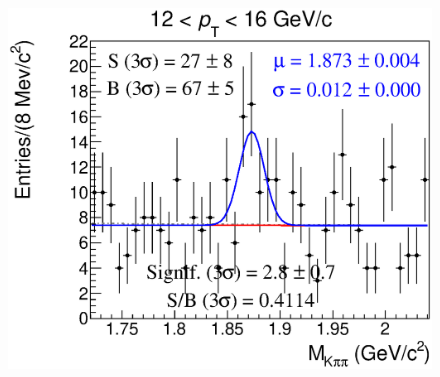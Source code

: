 \documentclass[b5paper,10pt,twoside,oldstyle,classica]{toptesi}
\begin{document}
\begin{figure}[h]
\begin{center}
{\includegraphics[scale = 0.25]{MassFitSet3_Pt6.eps}}
\end{center}
\end{figure}
\clearpage
\end{document}
